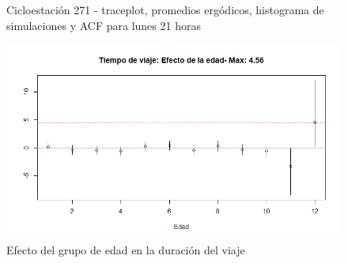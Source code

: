 \documentclass[9pt,twocolumn,twoside]{ilcss}
\begin{document}
\begin{appendices}
\begin{figure}[tbhp]
	\caption{ Cicloestación 271 - traceplot, promedios ergódicos, histograma de simulaciones y ACF para lunes 21 horas}
	\label{fig:pen_habs_penbces271_diahora}
\end{figure}
\begin{figure}[tbhp]
	\centering
	\includegraphics[width=0.9\linewidth]{Paper/images/72_efecto_edad.png}
	\caption{ Efecto del grupo de edad en la duración del viaje}
	\label{fig:72_efecto_edad}
\end{figure}
\end{appendices}
\end{document}
